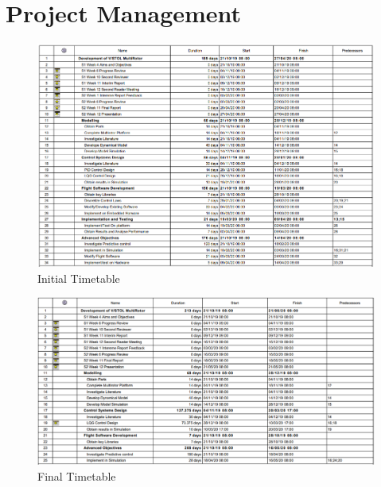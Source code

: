 \documentclass[12pt,a4paper,twoside]{report}
\begin{document}
		\section{Project Management}
			
			\begin{figure}[h!]
				\centering
				\includegraphics[width=1.1\linewidth]{ProjectInitialTimetable.png}
				\caption{Initial Timetable}
				\label{fig:initialtimetable}
			\end{figure}
		
			\begin{figure}[h!]
				\centering
				\includegraphics[width=1.1\linewidth]{ProjectFinalTimetable.png}
				\caption{Final Timetable}
				\label{fig:finaltimetable}
			\end{figure}
		
\end{document}
